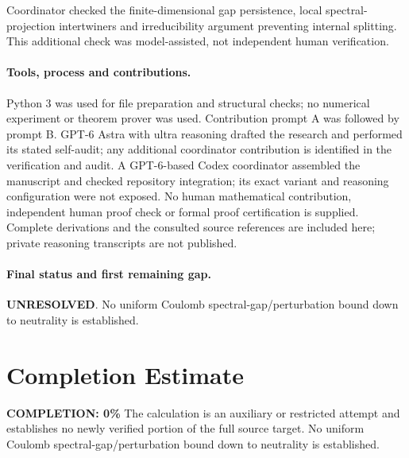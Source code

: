 \documentclass[11pt]{article}
\begin{document}
Coordinator checked the finite-dimensional gap persistence, local spectral-projection intertwiners and irreducibility argument preventing internal splitting. This additional check was model-assisted, not independent human verification.

\paragraph{Tools, process and contributions.}
Python 3 was used for file preparation and structural checks; no numerical experiment or theorem prover was used. Contribution prompt A was followed by prompt B. GPT-6 Astra with ultra reasoning drafted the research and performed its stated self-audit; any additional coordinator contribution is identified in the verification and audit. A GPT-6-based Codex coordinator assembled the manuscript and checked repository integration; its exact variant and reasoning configuration were not exposed. No human mathematical contribution, independent human proof check or formal proof certification is supplied. Complete derivations and the consulted source references are included here; private reasoning transcripts are not published.

\paragraph{Final status and first remaining gap.}
\textbf{UNRESOLVED}. No uniform Coulomb spectral-gap/perturbation bound down to neutrality is established.

\section{Completion Estimate}
\noindent\textbf{COMPLETION: 0\%}
The calculation is an auxiliary or restricted attempt and establishes no newly verified portion of the full source target. No uniform Coulomb spectral-gap/perturbation bound down to neutrality is established.
\end{document}
